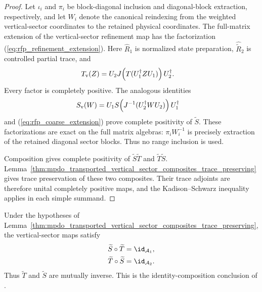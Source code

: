 \begin{proof}\leanok
    Let $\iota_i$ and $\pi_i$ be block-diagonal inclusion and diagonal-block
    extraction, respectively, and let $W_i$ denote the canonical reindexing
    from the weighted vertical-sector coordinates to the retained physical
    coordinates. The full-matrix extension of the vertical-sector refinement map
    has the factorization (\ref{eq:rfp_refinement_extension}). Here
    $\widehat R_1$ is normalized state preparation,
    $\widehat{\widetilde R}_2$ is controlled partial trace, and
    \begin{align}
        T_{\mathrm v}(Z)
         & =U_2J\!\left(T(U_1^\dagger ZU_1)\right)U_2^\dagger.
        \notag
    \end{align}
    Every factor is completely positive. The analogous identities
    \begin{align}
        S_{\mathrm v}(W)
         & =U_1S\!\left(J^{-1}(U_2^\dagger WU_2)\right)U_1^\dagger
        \notag
    \end{align}
    and (\ref{eq:rfp_coarse_extension}) prove complete positivity of
    $\widetilde S$. These factorizations are exact on the full matrix
    algebras: $\pi_iW_i^{-1}$ is precisely extraction of the retained diagonal
    sector blocks. Thus no range inclusion is used.

    Composition gives complete positivity of
    $\widetilde S\widetilde T$ and $\widetilde T\widetilde S$.
    Lemma~\ref{thm:mpdo_transported_vertical_sector_composites_trace_preserving}
    gives trace preservation of these two composites.
    Their trace adjoints are therefore unital completely positive maps, and
    the Kadison--Schwarz inequality applies in each simple summand.
\end{proof}

\begin{theorem}
    \label{thm:mpdo_transported_vertical_sector_composites_identity}
    \leanok
    Under the hypotheses of
    Lemma~\ref{thm:mpdo_transported_vertical_sector_composites_trace_preserving},
    the vertical-sector maps satisfy
    \begin{align}
        \widetilde S\circ\widetilde T
         & =\id_{\mathcal A_1},
        \label{eq:mpdo_vsector_ST_id} \\
        \widetilde T\circ\widetilde S
         & =\id_{\mathcal A_2}.
        \label{eq:mpdo_vsector_TS_id}
    \end{align}
    Thus $\widetilde T$ and $\widetilde S$ are mutually inverse. This is the
    identity-composition conclusion of
    \cite[Appendix~C.4, lines~1974--1995]{Cirac2016MPDO_arXiv}.
\end{theorem}

